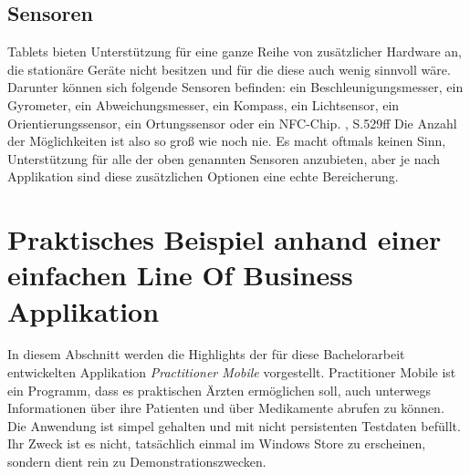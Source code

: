 \documentclass[a4paper,bibtotoc,oneside]{scrbook}
\begin{document}
\section[Sensoren]{Sensoren}
Tablets bieten Unterstützung für eine ganze Reihe von zusätzlicher Hardware an, die stationäre Geräte nicht besitzen und für die diese auch wenig sinnvoll wäre. Darunter können sich folgende Sensoren befinden: ein Beschleunigungsmesser, ein Gyrometer, ein Abweichungsmesser, ein Kompass, ein Lichtsensor, ein Orientierungssensor, ein Ortungssensor oder ein NFC-Chip. \cite{ana12}, S.529ff
\newline
Die Anzahl der Möglichkeiten ist also so groß wie noch nie. Es macht oftmals keinen Sinn, Unterstützung für alle der oben genannten Sensoren anzubieten, aber je nach Applikation sind diese zusätzlichen Optionen eine echte Bereicherung.


\chapter[Praktisches Beispiel anhand einer einfachen Line Of Business Applikation]{Praktisches Beispiel anhand einer einfachen Line Of Business Applikation}\label{practmobile}
In diesem Abschnitt werden die Highlights der für diese Bachelorarbeit entwickelten Applikation \textit{Practitioner Mobile} vorgestellt.
\newline
Practitioner Mobile ist ein Programm, dass es praktischen Ärzten ermöglichen soll, auch unterwegs Informationen über ihre Patienten und über Medikamente abrufen zu können. Die Anwendung ist simpel gehalten und mit nicht persistenten Testdaten befüllt. Ihr Zweck ist es nicht, tatsächlich einmal im Windows Store zu erscheinen, sondern dient rein zu Demonstrationszwecken.
\end{document}
